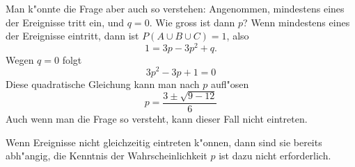 \begin{loesung}
\begin{teilaufgaben}
Man k"onnte die Frage aber auch so verstehen: Angenommen, mindestens
eines der Ereignisse tritt ein, und $q=0$. Wie gross ist dann $p$?
Wenn mindestens eines der Ereignisse eintritt, dann ist
$P(A\cup B\cup C)=1$, also
\[
1=3p-3p^2+q.
\]
Wegen $q=0$ folgt
\[
3p^2-3p+1=0
\]
Diese quadratische Gleichung kann man nach $p$ aufl"osen
\[
p=\frac{3\pm\sqrt{9-12}}{6}
\]
Auch wenn man die Frage so versteht, kann dieser Fall nicht eintreten.
\item
Wenn Ereignisse nicht gleichzeitig eintreten k"onnen, dann sind
sie bereits abh"angig, die Kenntnis der Wahrscheinlichkeit $p$
ist dazu nicht erforderlich.
\end{teilaufgaben}
\end{loesung}

